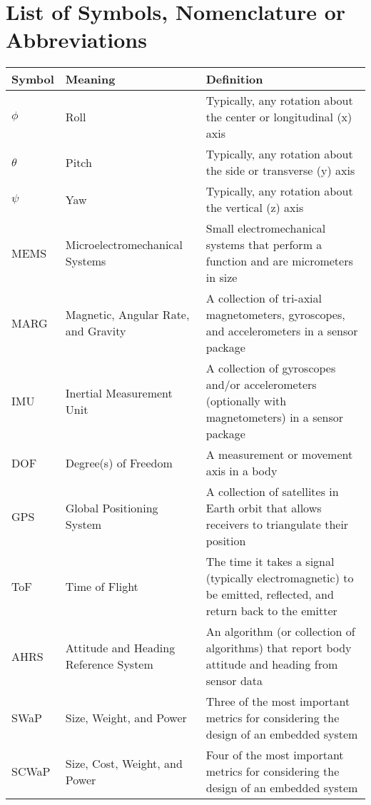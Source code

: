 \chapter*{List of Symbols, Nomenclature or
Abbreviations} 

\begin{longtable}{l m{} m{}}
        Symbol & Meaning & Definition \\
        \hline
        $\phi$ & Roll & Typically, any rotation about the center or longitudinal (x) axis \\
        $\theta$ & Pitch & Typically, any rotation about the side or transverse (y) axis \\
        $\psi$ & Yaw & Typically, any rotation about the vertical (z) axis \\
        MEMS & Microelectromechanical Systems & Small electromechanical systems that perform a function and are micrometers in size \\
        MARG & Magnetic, Angular Rate, and Gravity & A collection of tri-axial magnetometers, gyroscopes, and accelerometers in a sensor package \\
        IMU & Inertial Measurement Unit & A collection of gyroscopes and/or accelerometers (optionally with magnetometers) in a sensor package \\
        DOF & Degree(s) of Freedom & A measurement or movement axis in a body \\
        GPS & Global Positioning System & A collection of satellites in Earth orbit that allows receivers to triangulate their position \\
        ToF & Time of Flight & The time it takes a signal (typically electromagnetic) to be emitted, reflected, and return back to the emitter \\
        AHRS & Attitude and Heading Reference System & An algorithm (or collection of algorithms) that report body attitude and heading from sensor data \\
        SWaP & Size, Weight, and Power & Three of the most important metrics for considering the design of an embedded system \\
        SCWaP & Size, Cost, Weight, and Power & Four of the most important metrics for considering the design of an embedded system \\

\end{longtable}
